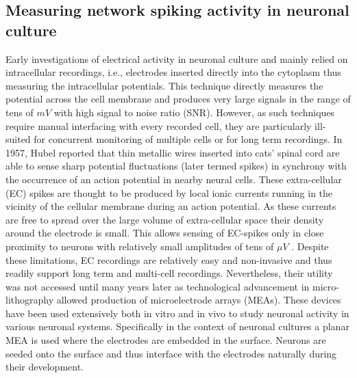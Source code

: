     \subsection{Measuring network spiking activity in neuronal culture}
    Early investigations of electrical activity in neuronal culture and mainly relied on intracellular recordings, i.e., electrodes inserted directly into the cytoplasm thus measuring the intracellular potentials. This technique directly measures the potential across the cell membrane and produces very large signals in the range of tens of \(mV\) with high signal to noise ratio (SNR). However, as such techniques require manual interfacing with every recorded cell, they are particularly ill-suited for concurrent monitoring of multiple cells or for long term recordings. In 1957, Hubel \cite{hubel1957tungsten} reported that thin metallic wires inserted into cats' spinal cord are able to sense sharp potential fluctuations (later termed spikes) in synchrony with the occurrence of an action potential in nearby neural cells. These extra-cellular (EC) spikes are thought to be produced by local ionic currents running in the vicinity of the cellular membrane during an action potential. As these currents are free to spread over the large volume of extra-cellular space their density around the electrode is small. This allows sensing of EC-spikes only in close proximity to neurons with relatively small amplitudes of tens of $\mu V$ \cite{herzog2011optical}. Despite these limitations, EC recordings are relatively easy and non-invasive and thus readily support long term and multi-cell recordings. Nevertheless, their utility was not accessed until many years later as technological advancement in micro-lithography allowed production of microelectrode arrays (MEAs)\cite{Morin2005,Buzsaki2004}. These devices have been used extensively both in vitro and in vivo to study neuronal activity in various neuronal systems. Specifically in the context of neuronal cultures a planar MEA is used where the electrodes are embedded in the surface. Neurons are seeded onto the surface and thus interface with the electrodes naturally during their development\cite{PotterRev2001,Morin2005,Marom02}.

